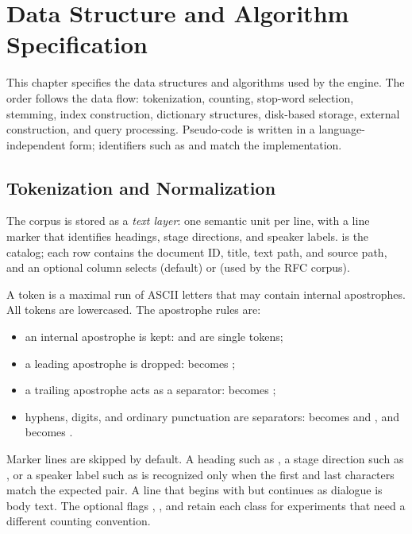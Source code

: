 
\section{Data Structure and Algorithm Specification}
\label{sec:design}

This chapter specifies the data structures and algorithms used by the engine.
The order follows the data flow: tokenization, counting, stop-word selection,
stemming, index construction, dictionary structures, disk-based storage,
external construction, and query processing. Pseudo-code is written in a
language-independent form; identifiers such as  and
 match the implementation.

\subsection{Tokenization and Normalization}
\label{sec:tokenization}

The corpus is stored as a \emph{text layer}: one semantic unit per line, with a
line marker that identifies headings, stage directions, and speaker labels.
 is the catalog; each row contains the document ID, title,
text path, and source path, and an optional  column selects
 (default) or  (used by the RFC corpus).

A token is a maximal run of ASCII letters that may contain internal
apostrophes. All tokens are lowercased. The apostrophe rules are:

\begin{itemize}
  \item an internal apostrophe is kept:  and  are single
        tokens;
  \item a leading apostrophe is dropped:  becomes ;
  \item a trailing apostrophe acts as a separator:  becomes
        ;
  \item hyphens, digits, and ordinary punctuation are separators:
         becomes  and , and 
        becomes .
\end{itemize}

Marker lines are skipped by default. A heading such as \code{[ACT I]}, a stage
direction such as , or a speaker label such as
 is recognized only when the first and last characters match
the expected pair. A line that begins with \code{[} but continues as dialogue
is body text. The optional flags , ,
and  retain each class for experiments that need a different
counting convention.

